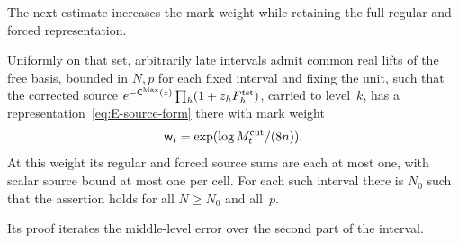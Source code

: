 The next estimate increases the mark weight while retaining the full regular and forced representation.
\begin{lemma}\label{lem:E-Gaussian-sources}
Uniformly on that set, arbitrarily late intervals admit common real lifts of the free basis, bounded in $N,p$ for each fixed interval and fixing the unit, such that the corrected source $e^{-\mathsf C^{\rm Max}(z)}\prod_h(1+z_hF_h^{\rm tst})$, carried to level~$k$, has a representation~\eqref{eq:E-source-form} there with mark weight
\begin{equation*}
 \mathsf w_t=\exp(\log M^{\mathrm{cut}}_t/(8n)).
\end{equation*}
At this weight its regular and forced source sums are each at most one, with scalar source bound at most one per cell.
For each such interval there is $N_0$ such that the assertion holds for all $N\ge N_0$ and all~$p$.
\end{lemma}
Its proof iterates the middle-level error over the second part of the interval.

